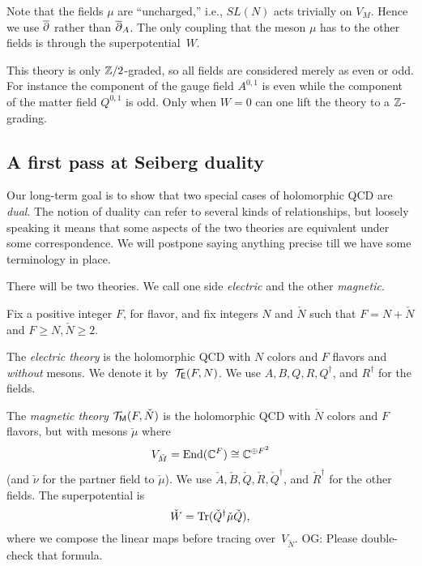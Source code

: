\documentclass[11pt]{amsart}
\def\SU{{\rm SU}}
\def\owen#1{{\textcolor{violet!65!black}{OG: {#1}}}}
\begin{document}
Note that the fields $\mu$ are ``uncharged,'' i.e., $SL(N)$ acts trivially on $V_M$.
Hence we use ${\overline{\partial}}$ rather than ${\overline{\partial}}_A$.
The only coupling that the meson $\mu$ has to the other fields is through the superpotential~$W$. 

\begin{rmk}
This theory is only $\mathbb Z/2$-graded, so all fields are considered merely as even or odd.
For instance the component of the gauge field $A^{0,1}$ is even while the component of the matter field $Q^{0,1}$ is odd. 
Only when $W = 0$ can one lift the theory to a $\mathbb Z$-grading.
\end{rmk}

\subsection{A first pass at Seiberg duality}

Our long-term goal is to show that two special cases of holomorphic QCD are {\em dual}.
The notion of duality can refer to several kinds of relationships,
but loosely speaking it means that some aspects of the two theories are equivalent under some correspondence.
We will postpone saying anything precise till we have some terminology in place.


There will be two theories. 
We call one side {\em electric} and the other {\em magnetic}.

\begin{dfn}
Fix a positive integer $F$, for flavor, and fix integers $N$ and $\check{N}$ such that $F = N + \check{N}$ and $F \geq N, \check{N} \geq 2$.

The {\em electric theory} is the holomorphic QCD with $N$ colors and $F$ flavors and {\em without} mesons.
We denote it by~$\mathcal T_{\mathsf E}(F, N)$.
We use $A, B, Q, R, Q^\dag$, and $R^\dag$ for the fields.

The {\em magnetic theory} $\mathcal T_{{\sf M}}(F, \check{N})$ is the holomorphic QCD with $\check{N}$ colors and $F$ flavors, but with mesons $\check{\mu}$ where $$V_{\check{M}} = {\rm End}(\mathbb C^F) \cong \mathbb C^{\oplus F^2}$$
(and $\check{\nu}$ for the partner field to $\check{\mu}$).
We use $\check{A}, \check{B}, \check{Q}, \check{R}, \check{Q}^\dag$, and $\check{R}^\dag$ for the other fields.
The superpotential is $$\check{W} =  {\rm Tr}(\check{Q}^\dag \check{\mu}  \check{Q}),$$
where we compose the linear maps before tracing over~$V_{\check{N}}$.
\owen{Please double-check that formula.}
\end{dfn}
\end{document}

